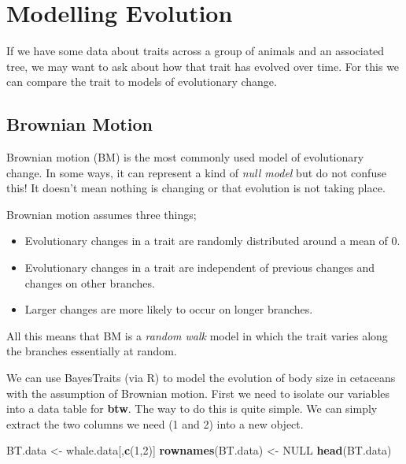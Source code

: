 \documentclass[
]{book}
\newenvironment{Shaded}{\begin{snugshade}}{\end{snugshade}}
\newcommand{\DecValTok}[1]{\textcolor[rgb]{0.00,0.00,0.81}{#1}}
\newcommand{\KeywordTok}[1]{\textcolor[rgb]{0.13,0.29,0.53}{\textbf{#1}}}
\newcommand{\NormalTok}[1]{#1}
\newcommand{\OtherTok}[1]{\textcolor[rgb]{0.56,0.35,0.01}{#1}}
\newcommand{\StringTok}[1]{\textcolor[rgb]{0.31,0.60,0.02}{#1}}
\providecommand{\tightlist}{%
  \setlength{\itemsep}{0pt}\setlength{\parskip}{0pt}}
\begin{document}
\hypertarget{modelling-evolution}{%
\section{Modelling Evolution}\label{modelling-evolution}}

If we have some data about traits across a group of animals and an associated tree, we may want to ask about how that trait has evolved over time. For this we can compare the trait to models of evolutionary change.

\hypertarget{brownian-motion}{%
\subsection{Brownian Motion}\label{brownian-motion}}

Brownian motion (BM) is the most commonly used model of evolutionary change. In some ways, it can represent a kind of \emph{null model} but do not confuse this! It doesn't mean nothing is changing or that evolution is not taking place.

Brownian motion assumes three things;

\begin{itemize}
\tightlist
\item
  Evolutionary changes in a trait are randomly distributed around a mean of 0.
\item
  Evolutionary changes in a trait are independent of previous changes and changes on other branches.
\item
  Larger changes are more likely to occur on longer branches.
\end{itemize}

All this means that BM is a \emph{random walk} model in which the trait varies along the branches essentially at random.

We can use BayesTraits (via R) to model the evolution of body size in cetaceans with the assumption of Brownian motion. First we need to isolate our variables into a data table for \textbf{btw}. The way to do this is quite simple. We can simply extract the two columns we need (1 and 2) into a new object.

\begin{Shaded}
\begin{Highlighting}[]
\NormalTok{BT.data \textless{}{-}}\StringTok{ }\NormalTok{whale.data[,}\KeywordTok{c}\NormalTok{(}\DecValTok{1}\NormalTok{,}\DecValTok{2}\NormalTok{)]}
\KeywordTok{rownames}\NormalTok{(BT.data) \textless{}{-}}\StringTok{ }\OtherTok{NULL}
\KeywordTok{head}\NormalTok{(BT.data)}
\end{Highlighting}
\end{Shaded}
\end{document}
